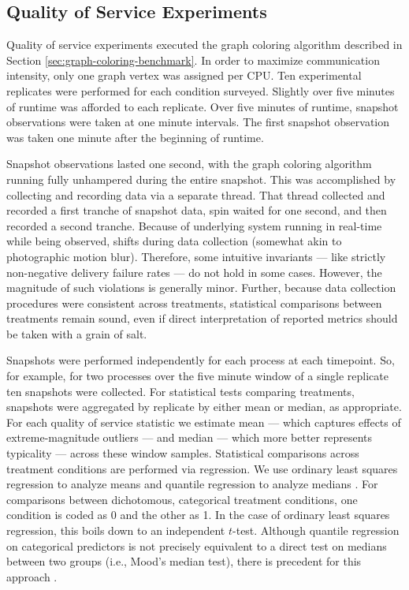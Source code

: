 \subsection{Quality of Service Experiments} \label{sec:quality-of-service-experiments}

Quality of service experiments executed the graph coloring algorithm described in Section \ref{sec:graph-coloring-benchmark}.
In order to maximize communication intensity, only one graph vertex was assigned per CPU.
Ten experimental replicates were performed for each condition surveyed.
Slightly over five minutes of runtime was afforded to each replicate.
Over five minutes of runtime, snapshot observations were taken at one minute intervals.
The first snapshot observation was taken one minute after the beginning of runtime.

Snapshot observations lasted one second, with the graph coloring algorithm running fully unhampered during the entire snapshot.
This was accomplished by collecting and recording data via a separate thread.
That thread collected and recorded a first tranche of snapshot data, spin waited for one second, and then recorded a second tranche.
Because of underlying system running in real-time while being observed, shifts during data collection (somewhat akin to photographic motion blur).
Therefore, some intuitive invariants --- like strictly non-negative delivery failure rates --- do not hold in some cases.
However, the magnitude of such violations is generally minor.
Further, because data collection procedures were consistent across treatments, statistical comparisons between treatments remain sound, even if direct interpretation of reported metrics should be taken with a grain of salt.

Snapshots were performed independently for each process at each timepoint.
So, for example, for two processes over the five minute window of a single replicate ten snapshots were collected.
For statistical tests comparing treatments, snapshots were aggregated by replicate by either mean or median, as appropriate.
For each quality of service statistic we estimate mean --- which captures effects of extreme-magnitude outliers --- and median --- which more better represents typicality --- across these window samples.
Statistical comparisons across treatment conditions are performed via regression.
We use ordinary least squares regression to analyze means \citep{geladi1986partial} and quantile regression to analyze medians \citep{koenker2001quantile}.
For comparisons between dichotomous, categorical treatment conditions, one condition is coded as 0 and the other as 1.
In the case of ordinary least squares regression, this boils down to an independent $t$-test.
Although quantile regression on categorical predictors is not precisely equivalent to a direct test on medians between two groups (i.e., Mood's median test), there is precedent for this approach \citep{petscher2014quantile, konstantopoulos2019using}.

